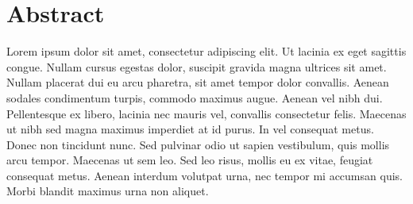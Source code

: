 \documentclass[a4paper, 12pt]{report}
\begin{document}
\chapter*{Abstract}
Lorem ipsum dolor sit amet, consectetur adipiscing elit. Ut lacinia ex eget sagittis congue.
Nullam cursus egestas dolor, suscipit gravida magna ultrices sit amet. Nullam placerat dui eu
arcu pharetra, sit amet tempor dolor convallis. Aenean sodales condimentum turpis, commodo maximus
augue. Aenean vel nibh dui. Pellentesque ex libero, lacinia nec mauris vel, convallis consectetur
felis. Maecenas ut nibh sed magna maximus imperdiet at id purus. In vel consequat metus. Donec non
tincidunt nunc. Sed pulvinar odio ut sapien vestibulum, quis mollis arcu tempor. Maecenas ut sem leo.
Sed leo risus, mollis eu ex vitae, feugiat consequat metus. Aenean interdum volutpat urna, nec
tempor mi accumsan quis. Morbi blandit maximus urna non aliquet.


\tableofcontents














\end{document}
